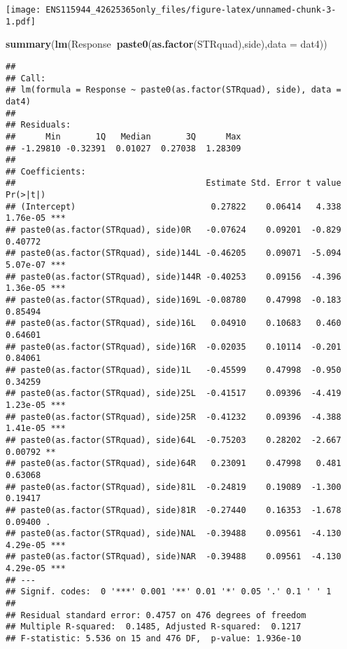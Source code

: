 \documentclass[
]{article}
\newenvironment{Shaded}{\begin{snugshade}}{\end{snugshade}}
\newcommand{\DataTypeTok}[1]{\textcolor[rgb]{0.13,0.29,0.53}{#1}}
\newcommand{\KeywordTok}[1]{\textcolor[rgb]{0.13,0.29,0.53}{\textbf{#1}}}
\newcommand{\NormalTok}[1]{#1}
\newcommand{\OperatorTok}[1]{\textcolor[rgb]{0.81,0.36,0.00}{\textbf{#1}}}
\begin{document}
\texttt{[image: ENS115944\_42625365only\_files/figure-latex/unnamed-chunk-3-1.pdf]}

\begin{Shaded}
\begin{Highlighting}[]
\KeywordTok{summary}\NormalTok{(}\KeywordTok{lm}\NormalTok{(Response}\OperatorTok{~}\KeywordTok{paste0}\NormalTok{(}\KeywordTok{as.factor}\NormalTok{(STRquad),side),}\DataTypeTok{data =}\NormalTok{ dat4))}
\end{Highlighting}
\end{Shaded}

\begin{verbatim}
## 
## Call:
## lm(formula = Response ~ paste0(as.factor(STRquad), side), data = dat4)
## 
## Residuals:
##      Min       1Q   Median       3Q      Max 
## -1.29810 -0.32391  0.01027  0.27038  1.28309 
## 
## Coefficients:
##                                      Estimate Std. Error t value Pr(>|t|)    
## (Intercept)                           0.27822    0.06414   4.338 1.76e-05 ***
## paste0(as.factor(STRquad), side)0R   -0.07624    0.09201  -0.829  0.40772    
## paste0(as.factor(STRquad), side)144L -0.46205    0.09071  -5.094 5.07e-07 ***
## paste0(as.factor(STRquad), side)144R -0.40253    0.09156  -4.396 1.36e-05 ***
## paste0(as.factor(STRquad), side)169L -0.08780    0.47998  -0.183  0.85494    
## paste0(as.factor(STRquad), side)16L   0.04910    0.10683   0.460  0.64601    
## paste0(as.factor(STRquad), side)16R  -0.02035    0.10114  -0.201  0.84061    
## paste0(as.factor(STRquad), side)1L   -0.45599    0.47998  -0.950  0.34259    
## paste0(as.factor(STRquad), side)25L  -0.41517    0.09396  -4.419 1.23e-05 ***
## paste0(as.factor(STRquad), side)25R  -0.41232    0.09396  -4.388 1.41e-05 ***
## paste0(as.factor(STRquad), side)64L  -0.75203    0.28202  -2.667  0.00792 ** 
## paste0(as.factor(STRquad), side)64R   0.23091    0.47998   0.481  0.63068    
## paste0(as.factor(STRquad), side)81L  -0.24819    0.19089  -1.300  0.19417    
## paste0(as.factor(STRquad), side)81R  -0.27440    0.16353  -1.678  0.09400 .  
## paste0(as.factor(STRquad), side)NAL  -0.39488    0.09561  -4.130 4.29e-05 ***
## paste0(as.factor(STRquad), side)NAR  -0.39488    0.09561  -4.130 4.29e-05 ***
## ---
## Signif. codes:  0 '***' 0.001 '**' 0.01 '*' 0.05 '.' 0.1 ' ' 1
## 
## Residual standard error: 0.4757 on 476 degrees of freedom
## Multiple R-squared:  0.1485, Adjusted R-squared:  0.1217 
## F-statistic: 5.536 on 15 and 476 DF,  p-value: 1.936e-10
\end{verbatim}
\end{document}
